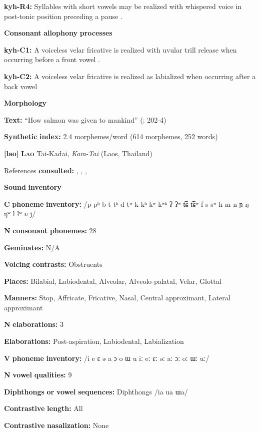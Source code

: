 \textbf{kyh-R4:} Syllables with short vowels may be realized with whispered voice in post-tonic position preceding a pause \citep[13]{Bright1957}.

\textbf{Consonant} \textbf{allophony} \textbf{processes}

\textbf{kyh-C1:} A voiceless velar fricative is realized with uvular trill release when occurring before a front vowel \citep{Bright1957}.

\textbf{kyh-C2:} A voiceless velar fricative is realized as labialized when occurring after a back vowel \citep[8]{Bright1957}

\textbf{Morphology}

\textbf{Text:} “How salmon was given to mankind” (\citealt{AnguloFreeland1971}: 202-4)

\textbf{Synthetic} \textbf{index:} 2.4 morphemes/word (614 morphemes, 252 words)

\textbf{[lao]}   \textbf{\textsc{Lao}}  Tai-Kadai, \textit{Kam-Tai} (Laos, Thailand)

References \textbf{consulted:} \citet{Enfield2004}, \citet{Enfield2007}, \citet{Erickson2001}, \citet{MorevEtAl1979}

\textbf{Sound} \textbf{inventory}

\textbf{C} \textbf{phoneme} \textbf{inventory:} /p pʰ b t tʰ d tʷ k kʰ kʷ kʷʰ ʔ ʔʷ t͡ɕ t͡ɕʷ f s sʷ h m n ɲ ŋ ŋʷ l lʷ ʋ j/

\textbf{N} \textbf{consonant} \textbf{phonemes:} 28

\textbf{Geminates:} N/A

\textbf{Voicing} \textbf{contrasts:} Obstruents

\textbf{Places:} Bilabial, Labiodental, Alveolar, Alveolo-palatal, Velar, Glottal

\textbf{Manners:} Stop, Affricate, Fricative, Nasal, Central approximant, Lateral approximant

\textbf{N} \textbf{elaborations:} 3

\textbf{Elaborations:} Post-aspiration, Labiodental, Labialization

\textbf{V} \textbf{phoneme} \textbf{inventory:} /i e ɛ ə a ɔ o ɯ u iː eː ɛː əː aː ɔː oː ɯː uː/

\textbf{N} \textbf{vowel} \textbf{qualities:} 9

\textbf{Diphthongs} \textbf{or} \textbf{vowel} \textbf{sequences:} Diphthongs /ia ua ɯa/

\textbf{Contrastive} \textbf{length:} All

\textbf{Contrastive} \textbf{nasalization:} None

